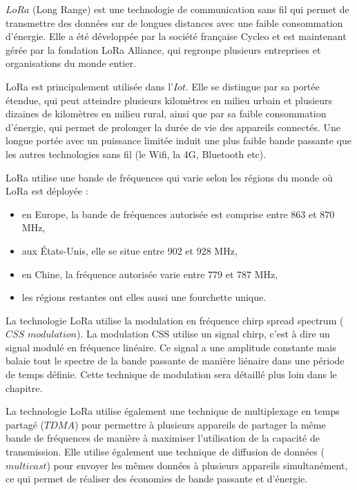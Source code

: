 $LoRa$ (Long Range) est une technologie de communication sans fil qui permet de transmettre des données sur de longues distances avec une faible consommation d'énergie. Elle a été développée par la société française Cycleo et est maintenant gérée par la fondation LoRa Alliance, qui regroupe plusieurs entreprises et organisations du monde entier.

\vspace{0.1cm}

LoRa est principalement utilisée dans l'$Iot$. Elle se distingue par sa portée étendue, qui peut atteindre plusieurs kilomètres en milieu urbain et plusieurs dizaines de kilomètres en milieu rural, ainsi que par sa faible consommation d'énergie, qui permet de prolonger la durée de vie des appareils connectés. Une longue portée avec un puissance limitée induit une plus faible bande passante que les autres technologies sans fil (le Wifi, la 4G, Bluetooth etc).

\vspace{0.1cm}

LoRa utilise une bande de fréquences qui varie selon les régions du monde où LoRa est déployée :

\vspace{0.1cm}

\begin{itemize}
\item en Europe, la bande de fréquences autorisée est comprise entre 863 et 870 MHz,
\item aux États-Unis, elle se situe entre 902 et 928 MHz,
\item en Chine, la fréquence autorisée varie entre 779 et 787 MHz,
\item les régions restantes ont elles aussi une fourchette unique.
\end{itemize}

\vspace{0.1cm}

La technologie LoRa utilise la modulation en fréquence chirp spread spectrum ($CSS$ $modulation$). La modulation CSS utilise un signal chirp, c'est à dire un signal modulé en fréquence linéaire. Ce signal a une amplitude constante mais balaie tout le spectre de la bande passante de manière liénaire dans une période de temps définie. Cette technique de modulation sera détaillé plus loin dans le chapitre.

\vspace{0.1cm}

La technologie LoRa utilise également une technique de multiplexage en temps partagé ($TDMA$) pour permettre à plusieurs appareils de partager la même bande de fréquences de manière à maximiser l'utilisation de la capacité de transmission. Elle utilise également une technique de diffusion de données ($multicast$) pour envoyer les mêmes données à plusieurs appareils simultanément, ce qui permet de réaliser des économies de bande passante et d'énergie.


